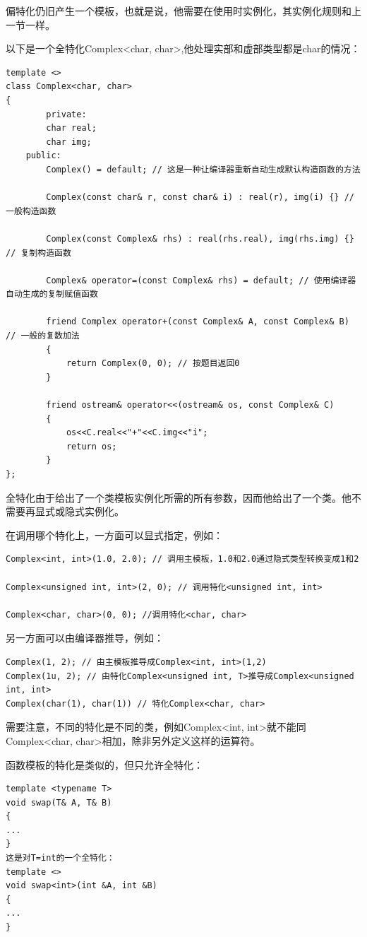 \documentclass[UTF8]{ctexart}
\begin{document}
偏特化仍旧产生一个模板，也就是说，他需要在使用时实例化，其实例化规则和上一节一样。

以下是一个全特化Complex<char, char>,他处理实部和虚部类型都是char的情况：
\begin{lstlisting}
template <>
class Complex<char, char>
{
        private:
        char real;
        char img;
    public:
        Complex() = default; // 这是一种让编译器重新自动生成默认构造函数的方法
        
        Complex(const char& r, const char& i) : real(r), img(i) {} // 一般构造函数
        
        Complex(const Complex& rhs) : real(rhs.real), img(rhs.img) {} // 复制构造函数
        
        Complex& operator=(const Complex& rhs) = default; // 使用编译器自动生成的复制赋值函数

        friend Complex operator+(const Complex& A, const Complex& B) // 一般的复数加法
        {
            return Complex(0, 0); // 按题目返回0
        }

        friend ostream& operator<<(ostream& os, const Complex& C)
        {
            os<<C.real<<"+"<<C.img<<"i";
            return os;
        }
};
\end{lstlisting}

全特化由于给出了一个类模板实例化所需的所有参数，因而他给出了一个类。他不需要再显式或隐式实例化。

在调用哪个特化上，一方面可以显式指定，例如：
\begin{lstlisting}
Complex<int, int>(1.0, 2.0); // 调用主模板，1.0和2.0通过隐式类型转换变成1和2

Complex<unsigned int, int>(2, 0); // 调用特化<unsigned int, int>

Complex<char, char>(0, 0); //调用特化<char, char>

\end{lstlisting}

另一方面可以由编译器推导，例如：
\begin{lstlisting}
Complex(1, 2); // 由主模板推导成Complex<int, int>(1,2)
Complex(1u, 2); // 由特化Complex<unsigned int, T>推导成Complex<unsigned int, int>
Complex(char(1), char(1)) // 特化Complex<char, char>
\end{lstlisting}

需要注意，不同的特化是不同的类，例如Complex<int, int>就不能同Complex<char, char>相加，除非另外定义这样的运算符。

函数模板的特化是类似的，但只允许全特化：
\begin{lstlisting}
template <typename T>
void swap(T& A, T& B)
{
...
}
这是对T=int的一个全特化：
template <>
void swap<int>(int &A, int &B)
{
...
}
\end{lstlisting}
\end{document}
